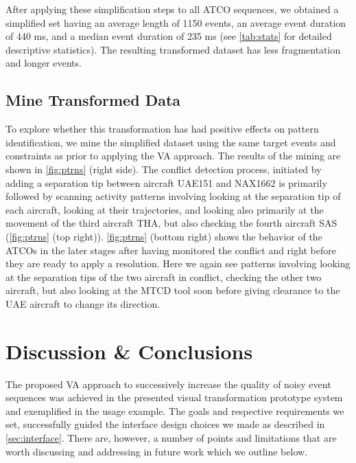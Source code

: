 \documentclass[camera]{vgtc}                          %
\begin{document}
After applying these simplification steps to all ATCO sequences, we obtained a simplified set having an average length of 1150 events, an average event duration of 440 ms, and a median event duration of 235 ms (see \autoref{tab:stats} for detailed descriptive statistics). 
The resulting transformed dataset has less fragmentation and longer events.

\subsection{Mine Transformed Data}
To explore whether this transformation has had positive effects on pattern identification, we mine the simplified dataset using the same target events and constraints as prior to applying the VA approach.
The results of the mining are shown in \autoref{fig:ptrns} (right side). The conflict detection process, initiated by adding a separation tip between aircraft UAE151 and NAX1662 is primarily followed by scanning activity patterns involving looking at the separation tip of each aircraft, looking at their trajectories, and looking also primarily at the movement of the third aircraft THA, but also checking the fourth aircraft SAS (\autoref{fig:ptrns} (top right)).
\autoref{fig:ptrns} (bottom right) shows the behavior of the ATCOs in the later stages after having monitored the conflict and right before they are ready to apply a resolution. Here we again see patterns involving looking at the separation tips of the two aircraft in conflict, checking the other two aircraft, but also looking at the MTCD tool soon before giving clearance to the UAE aircraft to change its direction.



\vspace{-4pt}
\section{Discussion \& Conclusions}
The proposed VA approach to successively increase the quality of noisy event sequences was achieved in the presented visual transformation prototype system and exemplified in the usage example. 
The goals and respective requirements we set, successfully guided the interface design choices we made as described in \autoref{sec:interface}.  
There are, however, a number of points and limitations that are worth discussing and addressing in future work which we outline below. 
\end{document}
